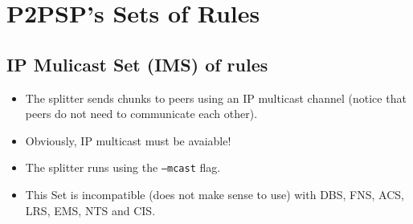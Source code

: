 \documentclass{article}
\begin{document}


\section{P2PSP's Sets of Rules}

\subsection{IP Mulicast Set (IMS) of rules}

\begin{itemize}
\item The splitter sends chunks to peers using an IP multicast
  channel (notice that peers do not need to communicate each other).
\item Obviously, IP multicast must be avaiable!
\item The splitter runs using the {\tt --mcast} flag.
\item This Set is incompatible (does not make sense to use) with DBS,
  FNS, ACS, LRS, EMS, NTS and CIS.
\end{itemize}

\ifx \HCode\Undfef
\else
{}
\fi
\end{document}
